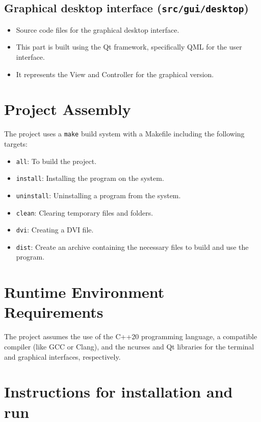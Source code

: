 \documentclass{article}
\begin{document}
\subsection{Graphical desktop interface (\texttt{src/gui/desktop})}

\begin{itemize}[label=--]
    \item Source code files for the graphical desktop interface.
    \item This part is built using the Qt framework, specifically QML for the user interface.
    \item It represents the View and Controller for the graphical version.
\end{itemize}

\section{Project Assembly}

The project uses a \texttt{make} build system with a Makefile including the following targets:

\begin{itemize}
    \item \texttt{all}: To build the project.
    \item \texttt{install}: Installing the program on the system.
    \item \texttt{uninstall}: Uninstalling a program from the system.
    \item \texttt{clean}: Clearing temporary files and folders.
    \item \texttt{dvi}: Creating a DVI file.
    \item \texttt{dist}: Create an archive containing the necessary files to build and use the program.
\end{itemize}

\section{Runtime Environment Requirements}

The project assumes the use of the C++20 programming language, a compatible compiler (like GCC or Clang), and the ncurses and Qt libraries for the terminal and graphical interfaces, respectively.

\section{Instructions for installation and run}
\end{document}

